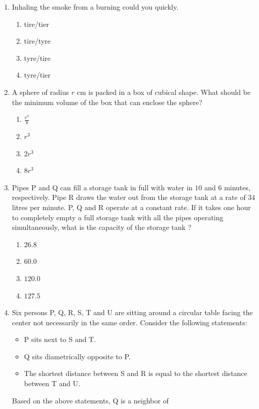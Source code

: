 \documentclass[journal]{IEEEtran}
\begin{document}
\begin{enumerate}[start=1]
\item Inhaling the smoke from a burning \underline{\hspace{2cm}} could \underline{\hspace{2cm}} you quickly.

\hfill{}
\begin{enumerate}
\item tire/tier
\item tire/tyre
\item tyre/tire
\item tyre/tier
\end{enumerate}

\item A sphere of radius $r$ cm is packed in a box of cubical shape. What should be the minimum volume  of the box that can enclose the sphere?

\hfill{}
\begin{enumerate}
\item $\frac{r^3}{8}$
\item $r^3$
\item $2r^3$
\item $8r^3$
\end{enumerate}

\item Pipes P and Q can fill a storage tank in full with water in $10$ and $6$ minutes, respectively. Pipe R draws the water out from the storage tank at a rate of $34$ litres per minute. P, Q and R operate at a constant rate. If it takes one hour to completely empty a full storage tank with all the pipes operating simultaneously, what is the capacity of the storage tank ?

\hfill{}
\begin{enumerate}
\item $26.8$
\item $60.0$
\item $120.0$
\item $127.5$
\end{enumerate}

\item Six persons P, Q, R, S, T and U are sitting around a circular table facing the center not necessarily in the same order. Consider the following statements:
\begin{itemize}
\item P sits next to S and T.
\item Q sits diametrically opposite to P.
\item The shortest distance between S and R is equal to the shortest distance between T and U.
\end{itemize}
Based on the above statements, Q is a neighbor of


\end{enumerate}
\end{document}
